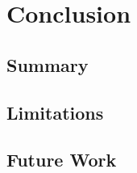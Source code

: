 \section{Conclusion}
\label{sec:conclusion}

\subsection{Summary}

\subsection{Limitations}

\subsection{Future Work}

